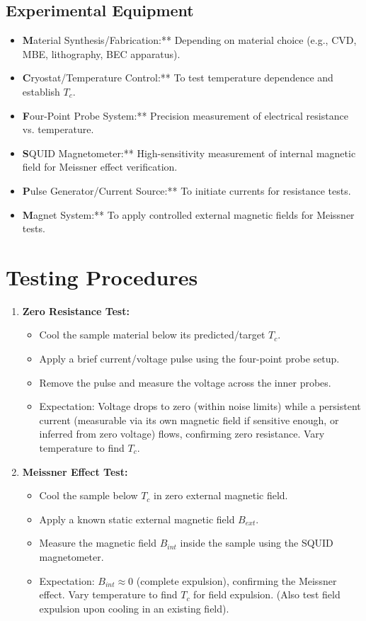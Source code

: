 \documentclass[a4paper,12pt]{article}
\begin{document}
\subsection{Experimental Equipment}
\begin{itemize}
    \item \textbf Material Synthesis/Fabrication:** Depending on material choice (e.g., CVD, MBE, lithography, BEC apparatus).
    \item \textbf Cryostat/Temperature Control:** To test temperature dependence and establish \(T_c\).
    \item \textbf Four-Point Probe System:** Precision measurement of electrical resistance vs. temperature.
    \item \textbf SQUID Magnetometer:** High-sensitivity measurement of internal magnetic field for Meissner effect verification.
    \item \textbf Pulse Generator/Current Source:** To initiate currents for resistance tests.
    \item \textbf Magnet System:** To apply controlled external magnetic fields for Meissner tests.
\end{itemize}

\section{Testing Procedures}
\begin{enumerate}
    \item \textbf{Zero Resistance Test:}
        \begin{itemize}
            \item Cool the sample material below its predicted/target \(T_c\).
            \item Apply a brief current/voltage pulse using the four-point probe setup.
            \item Remove the pulse and measure the voltage across the inner probes.
            \item Expectation: Voltage drops to zero (within noise limits) while a persistent current (measurable via its own magnetic field if sensitive enough, or inferred from zero voltage) flows, confirming zero resistance. Vary temperature to find \(T_c\).
        \end{itemize}
    \item \textbf{Meissner Effect Test:}
        \begin{itemize}
            \item Cool the sample below \(T_c\) in zero external magnetic field.
            \item Apply a known static external magnetic field \(B_{ext}\).
            \item Measure the magnetic field \(B_{int}\) inside the sample using the SQUID magnetometer.
            \item Expectation: \(B_{int} \approx 0\) (complete expulsion), confirming the Meissner effect. Vary temperature to find \(T_c\) for field expulsion. (Also test field expulsion upon cooling in an existing field).
        \end{itemize}
\end{enumerate}
\end{document}
